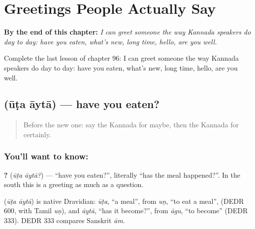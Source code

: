 
\chapter{Greetings People Actually Say}
\label{ch:ka-greetings-people-say}

\begin{chapteropening}
\textbf{By the end of this chapter:} \emph{I can greet someone the way Kannada speakers do day to day: have you eaten, what's new, long time, hello, are you well.}

Complete the last lesson of chapter 96: I can greet someone the way Kannada speakers do day to day: have you eaten, what's new, long time, hello, are you well.
\end{chapteropening}

\section[\texorpdfstring{\kn{ಊಟ} \kn{ಆಯ್ತಾ} (ūṭa āytā)}{ಊಟ ಆಯ್ತಾ (ūṭa āytā)}]{  (ūṭa āytā) — have you eaten?}

\label{lesson:KA-C96-eaten}



\begin{quote}
Before the new one: say the Kannada for maybe, then the Kannada for certainly.
\end{quote}

\subsection*{You'll want to know:  }
\textbf{ ?} (\emph{ūṭa āytā?}) — \textquotedblleft{}have you eaten?\textquotedblright{}, literally \textquotedblleft{}has the meal happened?\textquotedblright{}. In the south this is a greeting as much as a question.

\begin{cousinweb}
\textbf{ } (\emph{ūṭa āytā}) is native Dravidian: \emph{ūṭa}, \textquotedblleft{}a meal\textquotedblright{}, from \emph{uṇ}, \textquotedblleft{}to eat a meal\textquotedblright{}, (DEDR 600, with Tamil \emph{uṇ}), and \emph{āytā}, \textquotedblleft{}has it become?\textquotedblright{}, from \emph{āgu}, \textquotedblleft{}to become\textquotedblright{} (DEDR 333). DEDR 333 compares Sanskrit \emph{ām}.
\end{cousinweb}

